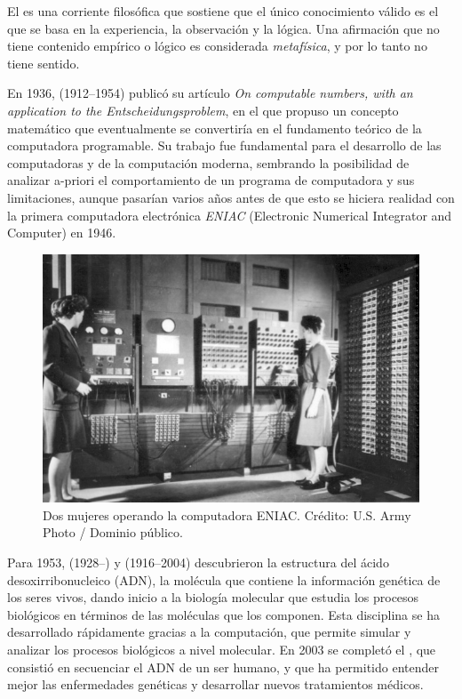 \begin{remember}
    \label{rem:empirismo lógico}
    El  es una corriente
    filosófica que sostiene que el único conocimiento válido es el que se basa
    en la experiencia, la observación y la lógica.
    Una afirmación que no tiene contenido empírico o lógico es considerada
    \emph{metafísica}, y por lo tanto no tiene sentido.
\end{remember}

En 1936,  (1912--1954) publicó su artículo
\emph{On computable numbers, with an application to the Entscheidungsproblem},
en el que propuso un concepto matemático que eventualmente se convertiría en el
fundamento teórico de la computadora programable.
Su trabajo fue fundamental para el desarrollo de las computadoras y de la
computación moderna, sembrando la posibilidad de analizar a-priori el
comportamiento de un programa de computadora y sus limitaciones, aunque pasarían
varios años antes de que esto se hiciera realidad con la primera computadora
electrónica \emph{ENIAC} (Electronic Numerical Integrator and Computer) en 1946.

\begin{figure}[ht]
    \centering
    \includegraphics[width=0.8\linewidth]{img/Two_women_operating_ENIAC}
    \caption{Dos mujeres operando la computadora ENIAC.
        Crédito: U.S. Army Photo / Dominio público.
    }
\end{figure}

Para 1953,  (1928--) y
 (1916--2004) descubrieron la estructura
del ácido desoxirribonucleico (ADN), la molécula que contiene la información
genética de los seres vivos, dando inicio a la %
{biología molecular} que estudia los procesos biológicos en términos de las
moléculas que los componen.
Esta disciplina se ha desarrollado rápidamente gracias a la computación, que
permite simular y analizar los procesos biológicos a nivel molecular.
En 2003 se completó el ,
que consistió en secuenciar el ADN de un ser humano, y que ha permitido
entender mejor las enfermedades genéticas y desarrollar nuevos tratamientos
médicos.

